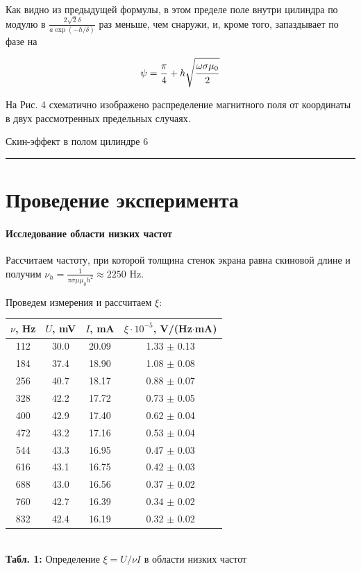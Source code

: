 \documentclass[12pt,a4paper]{scrartcl}
\begin{document}
	Как видно из предыдущей формулы, в этом пределе поле внутри цилиндра по модулю в $\frac{2\sqrt{2}\delta}{a\exp(-h/\delta)}$ раз меньше, чем снаружи, и, кроме того, запаздывает
	по фазе на
	
	$$\psi = \dfrac{\strut \pi}{\strut 4} + h\sqrt{\dfrac{\strut \omega \sigma \mu_0}{\strut 2}}$$
	
	На Рис. 4 схематично изображено распределение магнитного поля от координаты в двух рассмотренных предельных случаях.
	
	
	\newpage
	
	\begin{flushleft}
		\footnotesize{Скин-эффект в полом цилиндре} \hspace{\fill} \footnotesize{6}
		\\[-0.3cm]\noindent\rule{\textwidth}{0.3pt}
	\end{flushleft}
	
	\section{Проведение эксперимента}
	
	\paragraph{Исследование области низких частот} \hfill
	
	Рассчитаем частоту, при которой толщина стенок экрана равна скиновой длине и получим $\nu_h = \frac{1}{\pi \sigma \mu \mu_0 h^2} \approx 2250$ Hz.
	
	Проведем измерения и рассчитаем $\xi$:
	
	\begin{center}
		\begin{tabular}{|c|c|c|c|}
			\hline
			$\nu$, Hz & $U$, mV & $I$, mA & $\xi \cdot 10^{-5}$, V/(Hz$\cdot$mA)
			\\\hline
			112 & 30.0 & 20.09 & 1.33 $\pm$ 0.13
			\\\hline
			184 & 37.4 & 18.90 & 1.08 $\pm$ 0.08
			\\\hline
			256 & 40.7 & 18.17 & 0.88 $\pm$ 0.07
			\\\hline
			328 & 42.2 & 17.72 & 0.73 $\pm$ 0.05
			\\\hline
			400 & 42.9 & 17.40 & 0.62 $\pm$ 0.04
			\\\hline
			472 & 43.2 & 17.16 & 0.53 $\pm$ 0.04
			\\\hline
			544 & 43.3 & 16.95 & 0.47 $\pm$ 0.03
			\\\hline
			616 & 43.1 & 16.75 & 0.42 $\pm$ 0.03
			\\\hline
			688 & 43.0 & 16.56 & 0.37 $\pm$ 0.02
			\\\hline
			760 & 42.7 & 16.39 & 0.34 $\pm$ 0.02
			\\\hline
			832 & 42.4 & 16.19 & 0.32 $\pm$ 0.02
			\\\hline
		\end{tabular}
		\\\textbf{Табл. 1:} Определение $\xi = U/\nu I$ в области низких частот
	\end{center}
\end{document}
